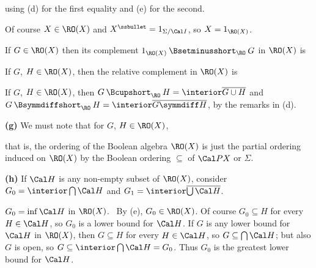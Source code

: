 {\noindent using (d) for the first equality and (e) for the second.

\medskip

 Of course $X\in\RO(X)$ and
$X^{\ssbullet}=1_{\Sigma/\Cal I}$, so $X=1_{\RO(X)}$.

\medskip

 If $G\in\RO(X)$ then its complement
$1_{\RO(X)}\hskip.2em\Bsetminusshort_{\RO}\hskip.2em G$ in $\RO(X)$ is


\medskip

 If $G$, $H\in\RO(X)$, then the relative complement in
$\RO(X)$ is


\medskip

 If $G$, $H\in\RO(X)$, then
$G\hskip.2em\Bcupshort_{\RO}\hskip.2em H
=\interior\overline{G\cup H}$ and $G\hskip.2em\Bsymmdiffshort_{\RO}\hskip.2em H
=\interior\overline{G\symmdiff H}$, by the remarks in (d).

\medskip

{\bf (g)} We must note that for $G$, $H\in\RO(X)$,


\noindent that is, the ordering of the Boolean algebra $\RO(X)$ is just
the partial ordering induced on $\RO(X)$ by the Boolean ordering
$\subseteq$ of $\Cal PX$ or $\Sigma$.

\medskip

{\bf (h)} If $\Cal H$ is any non-empty subset of $\RO(X)$, consider
$G_0=\interior\bigcap\Cal H$ and
$G_1=\interior\overline{\bigcup\Cal H}$.

$G_0=\inf\Cal H$ in $\RO(X)$.   \Prf\ By (e), $G_0\in\RO(X)$.   Of
course $G_0\subseteq H$ for every $H\in\Cal H$, so $G_0$ is a lower
bound for $\Cal H$.   If $G$ is any lower bound for $\Cal H$ in
$\RO(X)$, then $G\subseteq H$ for every $H\in\Cal H$, so
$G\subseteq\bigcap\Cal H$;  but also $G$ is open, so
$G\subseteq\interior\bigcap\Cal H=G_0$.   Thus $G_0$ is the greatest
lower bound for $\Cal H$.\ \Qed

}
